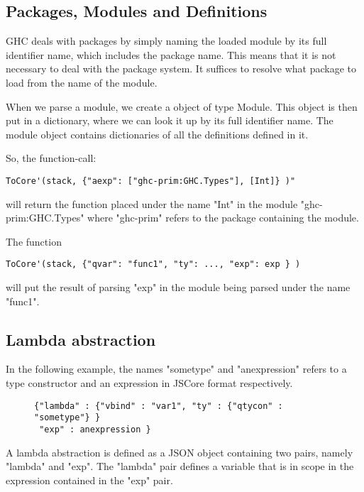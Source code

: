 \subsection*{Packages, Modules and Definitions}

GHC deals with packages by simply naming the loaded module by its full identifier
name, which includes the package name. This means that it is not necessary to deal
with the package system. It suffices to resolve what package to load from the name
of the module.

When we parse a module, we create a object of type Module. This object is
then put in a dictionary, where we can look it up by its full identifier name.
The module object contains dictionaries of all the definitions defined in it.

So, the function-call:
\lstset{ %
language=Haskell,
}
\begin{lstlisting}
ToCore'(stack, {"aexp": ["ghc-prim:GHC.Types"], [Int]} )" 
\end{lstlisting}

will return the function placed under the name "Int" in the module "ghc-prim:GHC.Types" 
where "ghc-prim" refers to the package containing the module. 

The function 
\lstset{ %
language=Haskell,
}
\begin{lstlisting}
ToCore'(stack, {"qvar": "func1", "ty": ..., "exp": exp } )
\end{lstlisting}
will
put the result of parsing "exp" in the module being parsed under the name "func1".

\subsection*{Lambda abstraction}

In the following example, the names "sometype" and "anexpression" refers to a 
type constructor and an expression in JSCore format respectively.

\begin{figure}[H]
\lstset{ %
language=Haskell,
}
\begin{lstlisting}
{"lambda" : {"vbind" : "var1", "ty" : {"qtycon" : "sometype"} }
 "exp" : anexpression }
\end{lstlisting}
\end{figure}

A lambda abstraction is defined as a JSON object containing two pairs, namely 
"lambda" and "exp". The "lambda" pair defines a variable that is in scope in the
expression contained in the "exp" pair.

